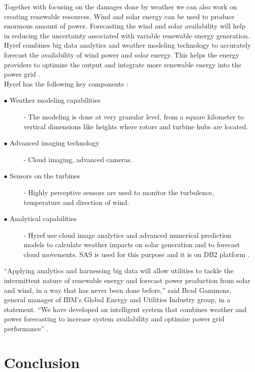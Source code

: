 \documentclass[sigconf]{acmart}
\begin{document}
Together with focusing on the damages done by weather we can also work on creating renewable resources. Wind and solar energy can be used to produce enormous amount of power. Forecasting the wind and solar availability will help in reducing the uncertainty associated with variable renewable energy generation.
Hyref combines big data analytics and weather modeling technology to accurately forecast the availability of wind power and solar energy. This helps the  energy providers to optimize the output and integrate more renewable energy into the power grid \cite{Hyref02}.\\

Hyref has the following key components :\\

\begin{description}

\item [$\bullet$ Weather modeling capabilities]- The modeling is done at very granular level, from a square kilometer to vertical dimensions like heights where rotors and turbine hubs are located.

\item [$\bullet$ Advanced imaging technology]- Cloud imaging, advanced cameras.

\item [$\bullet$ Sensors on the turbines]- Highly perceptive sensors are used to monitor the turbulence, temperature and direction of wind.

\item [$\bullet$ Analytical capabilities]- Hyref use cloud image analytics and advanced numerical prediction models to calculate weather impacts on solar generation and to forecast cloud movements. SAS is used for this purpose and it is on DB2 platform \cite{Hyref04}.\\

\end{description}


``Applying analytics and harnessing big data will allow utilities to tackle the intermittent nature of renewable energy and forecast power production from solar and wind, in a way that has never been done before,'' said Brad Gammons, general manager of IBM's Global Energy and Utilities Industry group, in a statement. ``We have developed an intelligent system that combines weather and power forecasting to increase system availability and optimize power grid performance'' \cite{Hyref03}.


\section{Conclusion}
\end{document}
